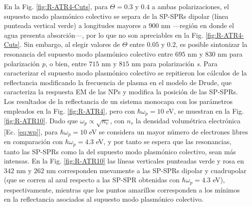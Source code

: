En la Fig. \ref{fig:R-ATR4-Cuts}, para $\Theta = 0.3$ y $0.4$ a ambas polarizaciones, el supuesto modo plasmónico colectivo se separa de la SP-SPRs dipolar (línea punteada vertical verde) a longitudes mayores a $900$ nm ---región en donde el agua presenta absorción---, por lo que 
no son apreciables en la Fig. \ref{fig:R-ATR4-Cuts}. Sin embargo, al elegir valores de $\Theta$ entre $0.05$ y $0.2$, es posible sintonizar la resonancia del supuesto modo plasmónico colectivo entre $695$ nm y $830$ nm para polarización \emph{p}, o bien, entre $715$ nm y $815$ nm para polarización \emph{s}. Para caracterizar el supuesto modo plasmónico colectivo se repitieron los cálculos de la reflectancia modificando la frecuencia de plasma en el modelo de Drude, que caracteriza la respuesta EM de las NPs y modifica la posición de las SP-SPRs. Los resultados de la reflectancia de un sistema monocapa con los parámetros empleados en la Fig. \ref{fig:R-ATR4}, pero con $\hbar\omega_p = 10$ eV, se muestran en la Fig. \ref{fig:R-ATR10}. Dado que $\omega_p\propto\sqrt{n_v}$, con $n_v$ la densidad volumétrica electrónica [Ec. \eqref{eq:wp}], para $\hbar\omega_p = 10$ eV se considera un mayor número de electrones libres en comparación con $\hbar\omega_p=4.3$ eV, y por tanto se espera que las resonancias, tanto las SP-SPRs como la del supuesto modo plasmónico colectivo, sean más intensas. En la Fig. \ref{fig:R-ATR10} las líneas verticales punteadas verde y rosa en $342$ nm y $262$ nm corresponden nuevamente a las SP-SPRs dipolar y cuadrupolar (que se corren al azul respecto a las SP-SPR obtenidas con $\hbar\omega_p=4.3$ eV), respectivamente, mientras que los puntos amarillos corresponden a los mínimos en la reflectancia asociados al supuesto modo plasmónico colectivo.
				
